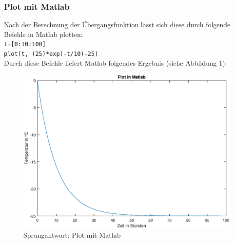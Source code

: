 \subsubsection{Plot mit Matlab}
Nach der Berechnung der Übergangsfunktion lässt sich diese durch folgende Befehle in Matlab plotten:\\
\texttt{t=[0:10:100]}\\
\texttt{plot(t, (25)*exp(-t/10)-25)}\\
Durch diese Befehle liefert Matlab folgendes Ergebnis (siehe Abbildung 1):
\begin{figure}[H]
    \centering
    \includegraphics[width=12cm]{images_2/Übergangsfunktion/Übergangsfkt_plot_matlab.eps}
    \caption{Sprungantwort: Plot mit Matlab}
\end{figure}

